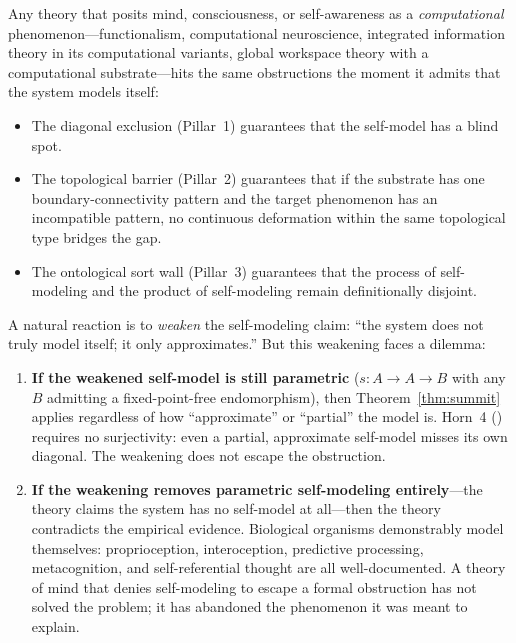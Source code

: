 \documentclass[11pt]{article}
\begin{document}
Any theory that posits mind, consciousness, or self-awareness as a
\emph{computational} phenomenon---functionalism, computational
neuroscience, integrated information theory in its computational
variants, global workspace theory with a computational substrate---hits
the same obstructions the moment it admits that the system models itself:

\begin{itemize}[leftmargin=1.5em,itemsep=0.2ex,topsep=0.4ex,parsep=0pt]
\item The diagonal exclusion (Pillar~1) guarantees that the self-model
  has a blind spot.
\item The topological barrier (Pillar~2) guarantees that if the
  substrate has one boundary-connectivity pattern and the target
  phenomenon has an incompatible pattern, no continuous deformation
  within the same topological type bridges the gap.
\item The ontological sort wall (Pillar~3) guarantees that the process
  of self-modeling and the product of self-modeling remain
  definitionally disjoint.
\end{itemize}

A natural reaction is to \emph{weaken} the self-modeling claim: ``the
system does not truly model itself; it only approximates.''  But this
weakening faces a dilemma:

\begin{enumerate}[label=(\alph*),itemsep=0.3ex]
\item \textbf{If the weakened self-model is still parametric}
  ($s : A \to A \to B$ with any $B$ admitting a fixed-point-free
  endomorphism), then Theorem~\ref{thm:summit} applies regardless of
  how ``approximate'' or ``partial'' the model is.  Horn~4
  () requires no
  surjectivity: even a partial, approximate self-model misses its own
  diagonal.  The weakening does not escape the obstruction.
\item \textbf{If the weakening removes parametric self-modeling
  entirely}---the theory claims the system has no self-model at
  all---then the theory contradicts the empirical evidence.  Biological
  organisms demonstrably model themselves: proprioception, interoception,
  predictive processing, metacognition, and self-referential thought are
  all well-documented.  A theory of mind that denies self-modeling to
  escape a formal obstruction has not solved the problem; it has
  abandoned the phenomenon it was meant to explain.
\end{enumerate}
\end{document}
